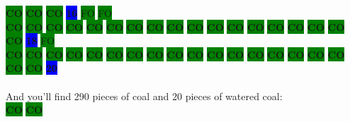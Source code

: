 \colorbox{green}{\color[rgb]{0,0,0}\textbf{CO}}%
\colorbox{green}{\color[rgb]{0,0,0}\textbf{CO}}%
\colorbox{green}{\color[rgb]{0,0,0}\textbf{CO}}%
\colorbox{blue}{\color[rgb]{1,0,0}\textbf{16}}%
\colorbox{green}{\color[gray]{0.75}FO}%
\colorbox{green}{\color[gray]{0.75}FO}%
\\
\colorbox{green}{\color[rgb]{0,0,0}\textbf{CO}}%
\colorbox{green}{\color[rgb]{0,0,0}\textbf{CO}}%
\colorbox{green}{\color[rgb]{0,0,0}\textbf{CO}}%
\colorbox{green}{\color[rgb]{0,0,0}\textbf{CO}}%
\colorbox{green}{\color[rgb]{0,0,0}\textbf{CO}}%
\colorbox{green}{\color[rgb]{0,0,0}\textbf{CO}}%
\colorbox{green}{\color[rgb]{0,0,0}\textbf{CO}}%
\colorbox{green}{\color[rgb]{0,0,0}\textbf{CO}}%
\colorbox{green}{\color[rgb]{0,0,0}\textbf{CO}}%
\colorbox{green}{\color[rgb]{0,0,0}\textbf{CO}}%
\colorbox{green}{\color[rgb]{0,0,0}\textbf{CO}}%
\colorbox{green}{\color[rgb]{0,0,0}\textbf{CO}}%
\colorbox{green}{\color[rgb]{0,0,0}\textbf{CO}}%
\colorbox{green}{\color[rgb]{0,0,0}\textbf{CO}}%
\colorbox{green}{\color[rgb]{0,0,0}\textbf{CO}}%
\colorbox{green}{\color[rgb]{0,0,0}\textbf{CO}}%
\colorbox{green}{\color[rgb]{0,0,0}\textbf{CO}}%
\colorbox{green}{\color[rgb]{0,0,0}\textbf{CO}}%
\colorbox{blue}{\color[rgb]{1,0,0}\textbf{18}}%
\colorbox{green}{\color[gray]{0.75}FO}%
\\
\colorbox{green}{\color[rgb]{0,0,0}\textbf{CO}}%
\colorbox{green}{\color[rgb]{0,0,0}\textbf{CO}}%
\colorbox{green}{\color[rgb]{0,0,0}\textbf{CO}}%
\colorbox{green}{\color[rgb]{0,0,0}\textbf{CO}}%
\colorbox{green}{\color[rgb]{0,0,0}\textbf{CO}}%
\colorbox{green}{\color[rgb]{0,0,0}\textbf{CO}}%
\colorbox{green}{\color[rgb]{0,0,0}\textbf{CO}}%
\colorbox{green}{\color[rgb]{0,0,0}\textbf{CO}}%
\colorbox{green}{\color[rgb]{0,0,0}\textbf{CO}}%
\colorbox{green}{\color[rgb]{0,0,0}\textbf{CO}}%
\colorbox{green}{\color[rgb]{0,0,0}\textbf{CO}}%
\colorbox{green}{\color[rgb]{0,0,0}\textbf{CO}}%
\colorbox{green}{\color[rgb]{0,0,0}\textbf{CO}}%
\colorbox{green}{\color[rgb]{0,0,0}\textbf{CO}}%
\colorbox{green}{\color[rgb]{0,0,0}\textbf{CO}}%
\colorbox{green}{\color[rgb]{0,0,0}\textbf{CO}}%
\colorbox{green}{\color[rgb]{0,0,0}\textbf{CO}}%
\colorbox{green}{\color[rgb]{0,0,0}\textbf{CO}}%
\colorbox{green}{\color[rgb]{0,0,0}\textbf{CO}}%
\colorbox{blue}{\color[rgb]{1,0,0}\textbf{20}}%
\\
\\
And you'll find 290 pieces of coal and 20 pieces of watered coal:
\\
\colorbox{green}{\color[rgb]{0,0,0}\textbf{CO}}%
\colorbox{green}{\color[rgb]{0,0,0}\textbf{CO}}%

